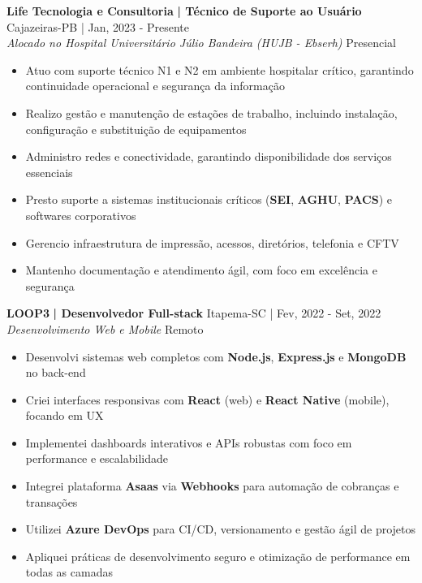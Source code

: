 \documentclass[a4paper]{article}
\begin{document}
\textbf{Life Tecnologia e Consultoria}\textbf{ | Técnico de Suporte ao Usuário} \hfill Cajazeiras-PB | Jan, 2023 - Presente\\
\textit{Alocado no Hospital Universitário Júlio Bandeira (HUJB - Ebserh)} \hfill Presencial\\
\vspace{-3mm}
\begin{itemize} \itemsep -3pt
    \item Atuo com suporte técnico N1 e N2 em ambiente hospitalar crítico, garantindo continuidade operacional e segurança da informação
    \item Realizo gestão e manutenção de estações de trabalho, incluindo instalação, configuração e substituição de equipamentos
    \item Administro redes e conectividade, garantindo disponibilidade dos serviços essenciais
    \item Presto suporte a sistemas institucionais críticos (\textbf{SEI}, \textbf{AGHU}, \textbf{PACS}) e softwares corporativos
    \item Gerencio infraestrutura de impressão, acessos, diretórios, telefonia e CFTV
    \item Mantenho documentação e atendimento ágil, com foco em excelência e segurança
\end{itemize}

\textbf{LOOP3}\textbf{ | Desenvolvedor Full-stack} \hfill Itapema-SC | Fev, 2022 - Set, 2022\\
\textit{Desenvolvimento Web e Mobile} \hfill Remoto\\
\vspace{-3mm}
\begin{itemize} \itemsep -3pt
    \item Desenvolvi sistemas web completos com \textbf{Node.js}, \textbf{Express.js} e \textbf{MongoDB} no back-end
    \item Criei interfaces responsivas com \textbf{React} (web) e \textbf{React Native} (mobile), focando em UX
    \item Implementei dashboards interativos e APIs robustas com foco em performance e escalabilidade
    \item Integrei plataforma \textbf{Asaas} via \textbf{Webhooks} para automação de cobranças e transações
    \item Utilizei \textbf{Azure DevOps} para CI/CD, versionamento e gestão ágil de projetos
    \item Apliquei práticas de desenvolvimento seguro e otimização de performance em todas as camadas
\end{itemize}
\end{document}
